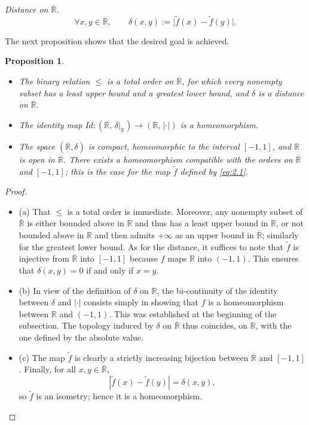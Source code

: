 \documentclass[11pt]{article}
\newtheorem{proposition}{Proposition}[section]
\theoremstyle{definition}
\begin{document}
\medskip\noindent
\textit{Distance on $\overline{\mathbb{R}}$.}
\begin{equation}\label{eq:2.2}
\forall x,y\in\overline{\mathbb{R}},\qquad
\delta(x,y):=\bigl|\tilde f(x)-\tilde f(y)\bigr|.
\end{equation}

The next proposition shows that the desired goal is achieved.

\begin{proposition}
\begin{itemize}[leftmargin=1.5em]
\item[(a)] The binary relation $\le$ is a total order on $\overline{\mathbb{R}}$, for which every nonempty subset has a least upper bound and a greatest lower bound, and $\delta$ is a distance on $\overline{\mathbb{R}}$.
\item[(b)] The identity map $Id:(\mathbb{R},\,\delta\!\big|_{\mathbb{R}})\to(\mathbb{R},\,|\cdot|)$ is a homeomorphism.
\item[(c)] The space $(\overline{\mathbb{R}},\delta)$ is compact, homeomorphic to the interval $[-1,1]$, and $\mathbb{R}$ is open in $\overline{\mathbb{R}}$.
There exists a homeomorphism compatible with the orders on $\overline{\mathbb{R}}$ and $[-1,1]$; this is the case for the map $\tilde f$ defined by \eqref{eq:2.1}.
\end{itemize}
\end{proposition}

\begin{proof}
\begin{itemize}
\item (a) That $\le$ is a total order is immediate.
Moreover, any nonempty subset of $\overline{\mathbb{R}}$ is either bounded above in $\mathbb{R}$ and thus has a least upper bound in $\mathbb{R}$, or not bounded above in $\mathbb{R}$ and then admits $+\infty$ as an upper bound in $\overline{\mathbb{R}}$; similarly for the greatest lower bound.
As for the distance, it suffices to note that $\tilde f$ is injective from $\overline{\mathbb{R}}$ into $[-1,1]$ because $f$ maps $\mathbb{R}$ into $(-1,1)$.
This ensures that $\delta(x,y)=0$ if and only if $x=y$.

\item (b) In view of the definition of $\delta$ on $\mathbb{R}$, the bi-continuity of the identity between $\delta$ and $|\cdot|$ consists simply in showing that $f$ is a homeomorphism between $\mathbb{R}$ and $(-1,1)$.
This was established at the beginning of the subsection.
The topology induced by $\delta$ on $\overline{\mathbb{R}}$ thus coincides, on $\mathbb{R}$, with the one defined by the absolute value.

\item (c) The map $\tilde f$ is clearly a strictly increasing bijection between $\overline{\mathbb{R}}$ and $[-1,1]$.
Finally, for all $x,y\in\overline{\mathbb{R}}$,
\[
|\tilde f(x)-\tilde f(y)|=\delta(x,y),
\]
so $\tilde f$ is an isometry; hence it is a homeomorphism.
\end{itemize}
\end{proof}
\end{document}
